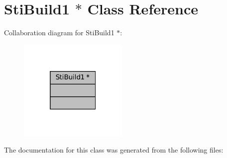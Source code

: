 \hypertarget{classStiBuild1_01_5}{}\section{Sti\+Build1 $\ast$ Class Reference}
\label{classStiBuild1_01_5}


Collaboration diagram for Sti\+Build1 $\ast$\+:
\nopagebreak
\begin{figure}[H]
\begin{center}
\leavevmode
\includegraphics[width=148pt]{classStiBuild1_01_5__coll__graph}
\end{center}
\end{figure}


The documentation for this class was generated from the following files\+: